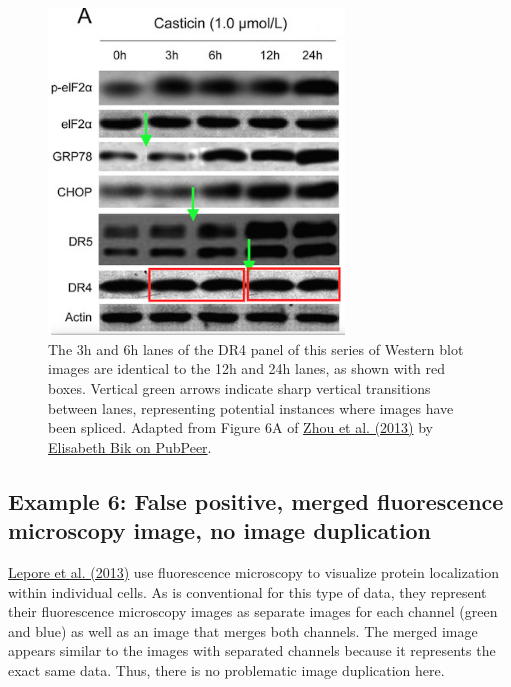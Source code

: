 \documentclass[letterpaper, 12pt]{article}
\begin{document}
\begin{figure}[h!tbp]
    \centering
    \includegraphics[width=0.7\textwidth]{img/image_duplication/image-1583362705327.jpg}
    \caption*{The 3h and 6h lanes of the DR4 panel of this series of Western blot images are identical to the 12h and 24h lanes, as shown with red boxes. Vertical green arrows indicate sharp vertical transitions between lanes, representing potential instances where images have been spliced. Adapted from Figure 6A of \href{https://doi.org/10.1371/journal.pone.0058855}{Zhou et al. (2013)} by \href{https://pubpeer.com/publications/2596C5A7287C83AFB4518CEF8AF7B4\#1}{Elisabeth Bik on PubPeer}.}
\end{figure}

\pagebreak

\subsection*{Example 6: False positive, merged fluorescence microscopy image, no image duplication}

\href{https://doi.org/10.1371/journal.pone.0083018}{Lepore et al. (2013)} use fluorescence microscopy to visualize protein localization within individual cells. As is conventional for this type of data, they represent their fluorescence microscopy images as separate images for each channel (green and blue) as well as an image that merges both channels. The merged image appears similar to the images with separated channels because it represents the exact same data. Thus, there is no problematic image duplication here.
\end{document}
